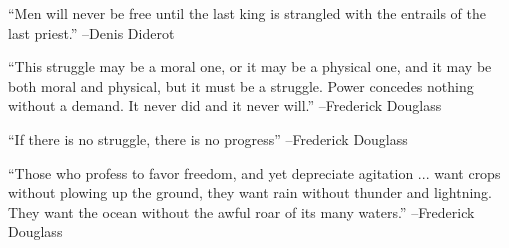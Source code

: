 \documentclass{article}%
\begin{document}
\begin{minipage}{\textwidth}%
\flushleft%
“Men will never be free until the last king is strangled with the entrails of the last priest.”%
\linebreak%
\vspace{1mm}%
–Denis Diderot%
\linebreak%
\vspace{1mm}%
\end{minipage}%
\linebreak%
\vspace{1mm}%
\begin{minipage}{\textwidth}%
\flushleft%
“This struggle may be a moral one, or it may be a physical one, and it may be both moral and physical, but it must be a struggle. Power concedes nothing without a demand. It never did and it never will.”%
\linebreak%
\vspace{1mm}%
–Frederick Douglass%
\linebreak%
\vspace{1mm}%
\end{minipage}%
\linebreak%
\vspace{1mm}%
\begin{minipage}{\textwidth}%
\flushleft%
“If there is no struggle, there is no progress”%
\linebreak%
\vspace{1mm}%
–Frederick Douglass%
\linebreak%
\vspace{1mm}%
\end{minipage}%
\linebreak%
\vspace{1mm}%
\begin{minipage}{\textwidth}%
\flushleft%
“Those who profess to favor freedom, and yet depreciate agitation ... want crops without plowing up the ground, they want rain without thunder and lightning. They want the ocean without the awful roar of its many waters.”%
\linebreak%
\vspace{1mm}%
–Frederick Douglass%
\linebreak%
\vspace{1mm}%
\end{minipage}%
\linebreak%
\vspace{1mm}%
\end{document}
